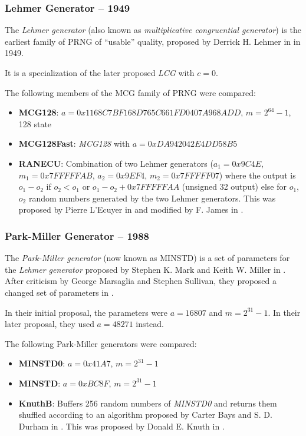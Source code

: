 \subsubsection[Lehmer Generator (MCG) -- 1949]{Lehmer Generator -- 1949} \label{subsubsec:mcg}

    The \emph{Lehmer generator} (also known as \emph{multiplicative congruential generator}) is the earliest family of PRNG of ``usable'' quality, proposed by Derrick H. Lehmer in \cite{Lehman:1951} in 1949.

    It is a specialization of the later proposed \emph{LCG} with $c = 0$.

    The following members of the MCG family of PRNG were compared:
    \begin{itemize}
		\itemsep0em
        \item \textbf{MCG128}:     $a = 0x1168C7BF168D765C661FD0407A968ADD$, $m = 2^{64} - 1$, \SI{128}{\bit} state
        \item \textbf{MCG128Fast}: \textit{MCG128} with $a = 0xDA942042E4DD58B5$
        \item \textbf{RANECU}: Combination of two Lehmer generators ($a_1 = 0x9C4E$, $m_1 = 0x7FFFFFAB$, $a_2 = 0x9EF4$, $m_2 = 0x7FFFFF07$) where the output is $o_1 - o_2$ if $o_2 < o_1$ or $o_1 - o_2 + 0x7FFFFFAA$ (unsigned \SI{32}{\bit} output) else for $o_1$, $o_2$ random numbers generated by the two Lehmer generators. This was proposed by Pierre L'Ecuyer in \cite{LEcuyer:1988} and modified by F. James in \cite{James:1990}.
    \end{itemize}

\subsubsection[Park-Miller Generator -- 1988]{Park-Miller Generator -- 1988} \label{subsubsec:minstd}

    The \emph{Park-Miller generator} (now known as MINSTD) is a set of parameters for the \emph{Lehmer generator} proposed by Stephen K. Mark and Keith W. Miller in \cite{Park:1988}. After criticism by George Marsaglia and Stephen Sullivan, they proposed a changed set of parameters in \cite{Park:1993}.

    In their initial proposal, the parameters were $a = 16807$ and $m = 2^{31} - 1$. In their later proposal, they used $a = 48271$ instead.

    The following Park-Miller generators were compared:
    \begin{itemize}
		\itemsep0em
        \item \textbf{MINSTD0}: $a = 0x41A7$, $m = 2^{31} - 1$
        \item \textbf{MINSTD}:  $a = 0xBC8F$, $m = 2^{31} - 1$
        \item \textbf{KnuthB}: Buffers 256 random numbers of \textit{MINSTD0} and returns them shuffled according to an algorithm proposed by Carter Bays and S. D. Durham in \cite{Bays:1976}. This was proposed by Donald E. Knuth in \cite{Knuth:1981}.
    \end{itemize}

